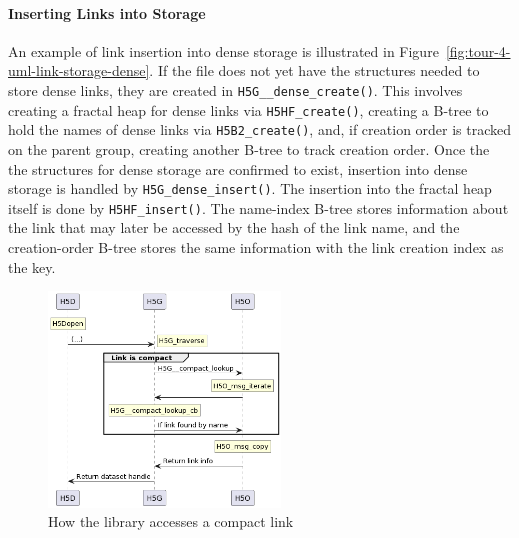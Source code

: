 \paragraph{Inserting Links into Storage} An example of link insertion into dense storage is illustrated in Figure~\ref{fig:tour-4-uml-link-storage-dense}. If the file does not yet have the structures needed to store dense links, they are created in \texttt{H5G\_\_dense\_create()}. This involves creating a fractal heap for dense links via \texttt{H5HF\_create()}, creating a B-tree to hold the names of dense links via \texttt{H5B2\_create()}, and, if creation order is tracked on the parent group, creating another B-tree to track creation order. Once the the structures for dense storage are confirmed to exist, insertion into dense storage is handled by \texttt{H5G\_dense\_insert()}. The insertion into the fractal heap itself is done by \texttt{H5HF\_insert()}. The name-index B-tree stores information about the link that may later be accessed by the hash of the link name, and the creation-order B-tree stores the same information with the link creation index as the key.

\begin{figure}
\centering
\includegraphics[width=0.55\textwidth]{images/tour_4_uml_link_access_compact.png}
\caption{How the library accesses a compact link}
\label{fig:tour-4-uml-link-access-compact}
\end{figure}

